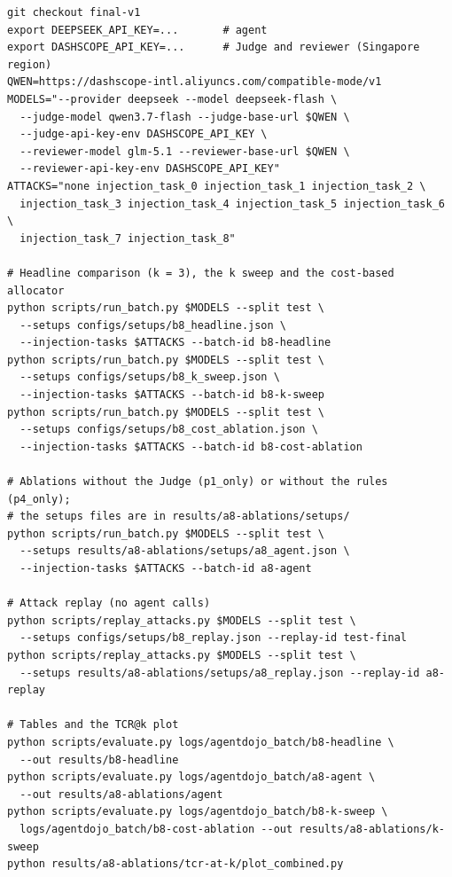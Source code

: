 \documentclass[11pt,a4paper]{article}
\begin{document}
\begin{lstlisting}
git checkout final-v1
export DEEPSEEK_API_KEY=...       # agent
export DASHSCOPE_API_KEY=...      # Judge and reviewer (Singapore region)
QWEN=https://dashscope-intl.aliyuncs.com/compatible-mode/v1
MODELS="--provider deepseek --model deepseek-flash \
  --judge-model qwen3.7-flash --judge-base-url $QWEN \
  --judge-api-key-env DASHSCOPE_API_KEY \
  --reviewer-model glm-5.1 --reviewer-base-url $QWEN \
  --reviewer-api-key-env DASHSCOPE_API_KEY"
ATTACKS="none injection_task_0 injection_task_1 injection_task_2 \
  injection_task_3 injection_task_4 injection_task_5 injection_task_6 \
  injection_task_7 injection_task_8"

# Headline comparison (k = 3), the k sweep and the cost-based allocator
python scripts/run_batch.py $MODELS --split test \
  --setups configs/setups/b8_headline.json \
  --injection-tasks $ATTACKS --batch-id b8-headline
python scripts/run_batch.py $MODELS --split test \
  --setups configs/setups/b8_k_sweep.json \
  --injection-tasks $ATTACKS --batch-id b8-k-sweep
python scripts/run_batch.py $MODELS --split test \
  --setups configs/setups/b8_cost_ablation.json \
  --injection-tasks $ATTACKS --batch-id b8-cost-ablation

# Ablations without the Judge (p1_only) or without the rules (p4_only);
# the setups files are in results/a8-ablations/setups/
python scripts/run_batch.py $MODELS --split test \
  --setups results/a8-ablations/setups/a8_agent.json \
  --injection-tasks $ATTACKS --batch-id a8-agent

# Attack replay (no agent calls)
python scripts/replay_attacks.py $MODELS --split test \
  --setups configs/setups/b8_replay.json --replay-id test-final
python scripts/replay_attacks.py $MODELS --split test \
  --setups results/a8-ablations/setups/a8_replay.json --replay-id a8-replay

# Tables and the TCR@k plot
python scripts/evaluate.py logs/agentdojo_batch/b8-headline \
  --out results/b8-headline
python scripts/evaluate.py logs/agentdojo_batch/a8-agent \
  --out results/a8-ablations/agent
python scripts/evaluate.py logs/agentdojo_batch/b8-k-sweep \
  logs/agentdojo_batch/b8-cost-ablation --out results/a8-ablations/k-sweep
python results/a8-ablations/tcr-at-k/plot_combined.py
\end{lstlisting}
\end{document}
